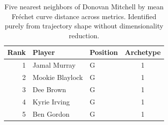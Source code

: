 \begin{table}[htbp]
  \centering\small
  \begin{tabular}{rllc}
    \toprule
    Rank & Player & Position & Archetype \\
    \midrule
    1 & Jamal Murray & G & 1 \\
    2 & Mookie Blaylock & G & 1 \\
    3 & Dee Brown & G & 1 \\
    4 & Kyrie Irving & G & 1 \\
    5 & Ben Gordon & G & 1 \\
    \bottomrule
  \end{tabular}
  \caption{Five nearest neighbors of Donovan Mitchell by mean Fr\'{e}chet curve distance across metrics. Identified purely from trajectory shape without dimensionality reduction.}
  \label{tab:Donovan_Mitchell_frechet_curve_neighbors}
\end{table}

